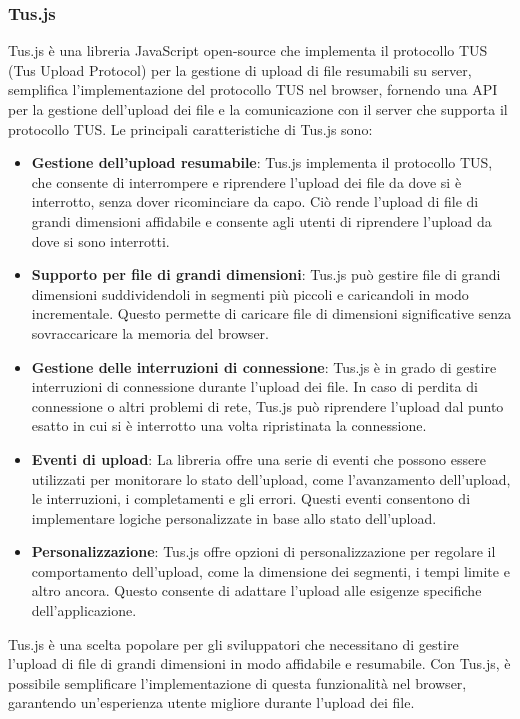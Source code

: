 \subsubsection{Tus.js}
Tus.js è una libreria JavaScript open-source che implementa il protocollo TUS (Tus Upload Protocol) per la gestione di upload di file resumabili su server, semplifica l'implementazione del protocollo TUS nel browser, fornendo una API per la gestione dell'upload dei file e la comunicazione con il server che supporta il protocollo TUS.
Le principali caratteristiche di Tus.js sono:
\begin{itemize}
    \item \textbf{Gestione dell'upload resumabile}: Tus.js implementa il protocollo TUS, che consente di interrompere e riprendere l'upload dei file da dove si è interrotto, senza dover ricominciare da capo. Ciò rende l'upload di file di grandi dimensioni affidabile e consente agli utenti di riprendere l'upload da dove si sono interrotti.
  \item \textbf{Supporto per file di grandi dimensioni}: Tus.js può gestire file di grandi dimensioni suddividendoli in segmenti più piccoli e caricandoli in modo incrementale. Questo permette di caricare file di dimensioni significative senza sovraccaricare la memoria del browser.
  \item \textbf{Gestione delle interruzioni di connessione}: Tus.js è in grado di gestire interruzioni di connessione durante l'upload dei file. In caso di perdita di connessione o altri problemi di rete, Tus.js può riprendere l'upload dal punto esatto in cui si è interrotto una volta ripristinata la connessione.
  \item \textbf{Eventi di upload}: La libreria offre una serie di eventi che possono essere utilizzati per monitorare lo stato dell'upload, come l'avanzamento dell'upload, le interruzioni, i completamenti e gli errori. Questi eventi consentono di implementare logiche personalizzate in base allo stato dell'upload.
  \item \textbf{Personalizzazione}: Tus.js offre opzioni di personalizzazione per regolare il comportamento dell'upload, come la dimensione dei segmenti, i tempi limite e altro ancora. Questo consente di adattare l'upload alle esigenze specifiche dell'applicazione.
\end{itemize}
Tus.js è una scelta popolare per gli sviluppatori che necessitano di gestire l'upload di file di grandi dimensioni in modo affidabile e resumabile. Con Tus.js, è possibile semplificare l'implementazione di questa funzionalità nel browser, garantendo un'esperienza utente migliore durante l'upload dei file.
